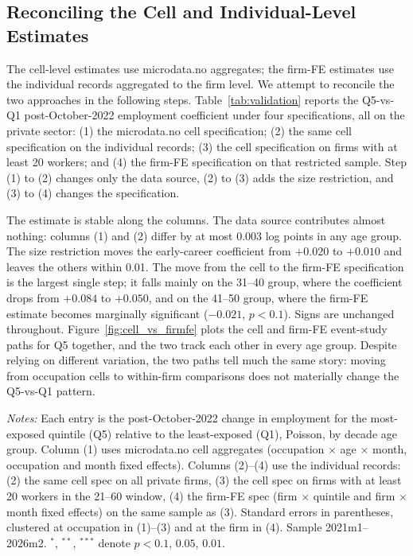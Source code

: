 \documentclass[12pt]{article}
\begin{document}
\subsection{Reconciling the Cell and Individual-Level Estimates}\label{sec:results:reconcile}

The cell-level estimates use microdata.no aggregates; the firm-FE estimates use the individual records aggregated to the firm level. We attempt to reconcile the two approaches in the following steps. Table~\ref{tab:validation} reports the Q5-vs-Q1 post-October-2022 employment coefficient under four specifications, all on the private sector: (1) the microdata.no cell specification; (2) the same cell specification on the individual records; (3) the cell specification on firms with at least 20 workers; and (4) the firm-FE specification on that restricted sample. Step (1) to (2) changes only the data source, (2) to (3) adds the size restriction, and (3) to (4) changes the specification.

The estimate is stable along the columns. The data source contributes almost nothing: columns (1) and (2) differ by at most 0.003 log points in any age group. The size restriction moves the early-career coefficient from $+0.020$ to $+0.010$ and leaves the others within 0.01. The move from the cell to the firm-FE specification is the largest single step; it falls mainly on the 31--40 group, where the coefficient drops from $+0.084$ to $+0.050$, and on the 41--50 group, where the firm-FE estimate becomes marginally significant ($-0.021$, $p<0.1$). Signs are unchanged throughout. Figure~\ref{fig:cell_vs_firmfe} plots the cell and firm-FE event-study paths for Q5 together, and the two track each other in every age group. Despite relying on different variation, the two paths tell much the same story: moving from occupation cells to within-firm comparisons does not materially change the Q5-vs-Q1 pattern.


\begin{table}[tp]
  \centering
  \caption{Cell-vs-individual reconciliation: Q5-vs-Q1 employment effect across nested specifications, private sector.}
  \label{tab:validation}
  
  \begin{minipage}{\textwidth}\footnotesize\textit{Notes:} Each entry is the post-October-2022 change in employment for the most-exposed quintile (Q5) relative to the least-exposed (Q1), Poisson, by decade age group. Column (1) uses microdata.no cell aggregates (occupation $\times$ age $\times$ month, occupation and month fixed effects). Columns (2)--(4) use the individual records: (2) the same cell spec on all private firms, (3) the cell spec on firms with at least 20 workers in the 21--60 window, (4) the firm-FE spec (firm $\times$ quintile and firm $\times$ month fixed effects) on the same sample as (3). Standard errors in parentheses, clustered at occupation in (1)--(3) and at the firm in (4). Sample 2021m1--2026m2. $^{*}$, $^{**}$, $^{***}$ denote $p<0.1$, $0.05$, $0.01$.\end{minipage}
\end{table}
\end{document}
